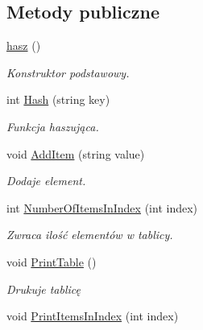 \subsection*{\-Metody publiczne}
\begin{DoxyCompactItemize}
\item 
\hypertarget{classhasz_a3e25ca51f87307e8a105fe3a90e34adb}{\hyperlink{classhasz_a3e25ca51f87307e8a105fe3a90e34adb}{hasz} ()}\label{classhasz_a3e25ca51f87307e8a105fe3a90e34adb}

\begin{DoxyCompactList}\small\item\em \-Konstruktor podstawowy. \end{DoxyCompactList}\item 
\hypertarget{classhasz_ab0ca9027d1e96be63b1ec3f4041dcacb}{int \hyperlink{classhasz_ab0ca9027d1e96be63b1ec3f4041dcacb}{\-Hash} (string key)}\label{classhasz_ab0ca9027d1e96be63b1ec3f4041dcacb}

\begin{DoxyCompactList}\small\item\em \-Funkcja haszująca. \end{DoxyCompactList}\item 
\hypertarget{classhasz_a3ca848ad48c73766a35eca1ed86ca6f5}{void \hyperlink{classhasz_a3ca848ad48c73766a35eca1ed86ca6f5}{\-Add\-Item} (string value)}\label{classhasz_a3ca848ad48c73766a35eca1ed86ca6f5}

\begin{DoxyCompactList}\small\item\em \-Dodaje element. \end{DoxyCompactList}\item 
\hypertarget{classhasz_a595b9407e15a7d1605a489795a275db9}{int \hyperlink{classhasz_a595b9407e15a7d1605a489795a275db9}{\-Number\-Of\-Items\-In\-Index} (int index)}\label{classhasz_a595b9407e15a7d1605a489795a275db9}

\begin{DoxyCompactList}\small\item\em \-Zwraca ilość elementów w tablicy. \end{DoxyCompactList}\item 
\hypertarget{classhasz_a9b6a864118cc5362c9beb1689fa84d1b}{void \hyperlink{classhasz_a9b6a864118cc5362c9beb1689fa84d1b}{\-Print\-Table} ()}\label{classhasz_a9b6a864118cc5362c9beb1689fa84d1b}

\begin{DoxyCompactList}\small\item\em \-Drukuje tablicę \end{DoxyCompactList}\item 
\hypertarget{classhasz_a35d9a7fabff376be070c4c548d893bec}{void \hyperlink{classhasz_a35d9a7fabff376be070c4c548d893bec}{\-Print\-Items\-In\-Index} (int index)}\label{classhasz_a35d9a7fabff376be070c4c548d893bec}


\end{DoxyCompactItemize}
